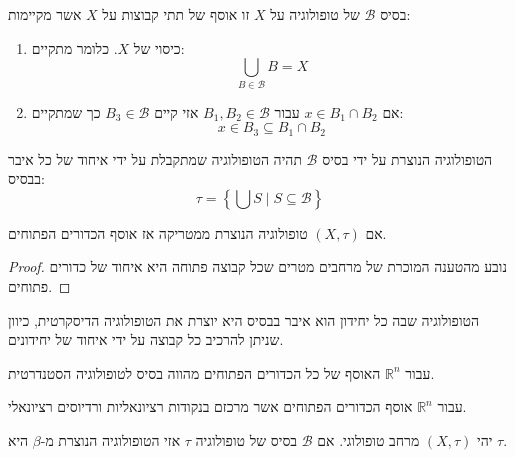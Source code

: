 \documentclass{tstextbook}
\begin{document}
\begin{definition}
בסיס \(\mathcal{B}\) של טופולוגיה על \(X\) זו אוסף של תתי קבוצות על \(X\) אשר מקיימות:

  \begin{enumerate}
    \item כיסוי של \(X\). כלומר מתקיים: 
$$\bigcup_{B\in{\mathcal{B}}}B=X$$


    \item אם \(x \in B_{1}\cap B_{2}\) עבור \(B_{1},B_{2}\in \mathcal{B}\) אזי קיים \(B_{3} \in \mathcal{B}\) כך שמתקיים: 
$$x\in B_{3}\subseteq B_{1}\cap B_{2}$$


  \end{enumerate}
\end{definition}
\begin{definition}
הטופולוגיה הנוצרת על ידי בסיס \(\mathcal{B}\) תהיה הטופולוגיה שמתקבלת על ידי איחוד של כל איבר בבסיס:
$$\tau=\left\{\bigcup S\mid S\subseteq\mathcal{B}\right\}$$

\end{definition}
\begin{proposition}
אם \(\left( X,\tau \right)\) טופולוגיה הנוצרת ממטריקה אז אוסף הכדורים הפתוחים.

\end{proposition}
\begin{proof}
נובע מהטענה המוכרת של מרחבים מטרים שכל קבוצה פתוחה היא איחוד של כדורים פתוחים.

\end{proof}
\begin{example}
הטופולוגיה שבה כל יחידון הוא איבר בבסיס היא יוצרת את הטופולוגיה הדיסקרטית, כיוון שניתן להרכיב כל קבוצה על ידי איחוד של יחידונים.

\end{example}
\begin{example}
עבור \(\mathbb{R}^{n}\) האוסף של כל הכדורים הפתוחים מהווה בסיס לטופולוגיה הסטנדרטית.

\end{example}
\begin{example}
עבור \(\mathbb{R}^{n}\) אוסף הכדורים הפתוחים אשר מרכזם בנקודות רציונאליות ורדיוסים רציונאלי.

\end{example}
\begin{proposition}
יהי \(\left( X,\tau \right)\) מרחב טופולוגי. אם \(\mathcal{B}\) בסיס של טופולוגיה \(\tau\) אזי הטופולוגיה הנוצרת מ-\(\beta\) היא \(\tau\).

\end{proposition}
\end{document}
